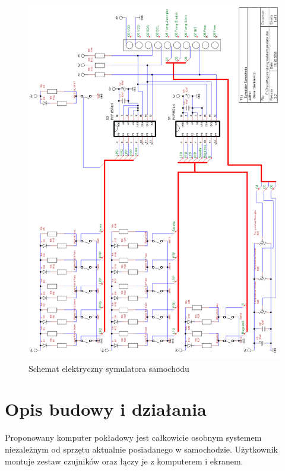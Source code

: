 \documentclass{xmgr}
\begin{document}
\begin{figure}[!hp]
    \centering
    	\includegraphics[height=0.9\textheight]{images/symulator.png}
    \caption{Schemat elektryczny symulatora samochodu}
\end{figure}

\section{Opis budowy i działania}
Proponowany komputer pokładowy jest całkowicie osobnym systemem niezależnym od sprzętu aktualnie posiadanego w samochodzie. Użytkownik montuje zestaw czujników oraz łączy je z komputerem i ekranem. 
\end{document}
